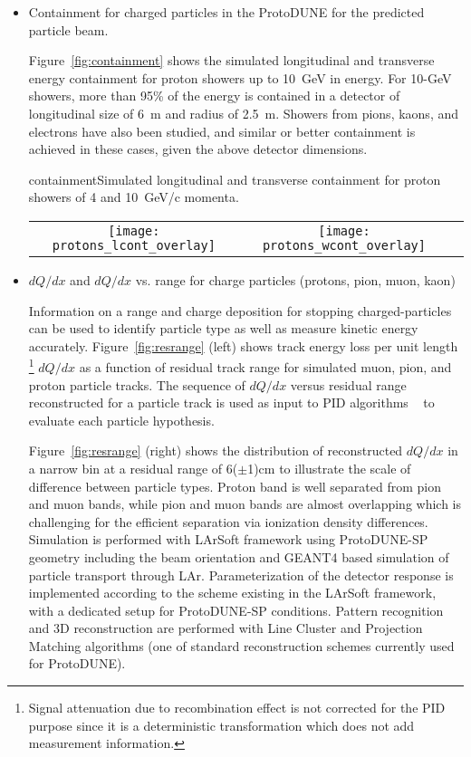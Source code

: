 \begin{itemize}
\item Containment for charged particles in the ProtoDUNE for the predicted particle beam. 

Figure~\ref{fig:containment} shows the simulated longitudinal and transverse 
energy containment for proton showers up to 10~GeV in energy.
For 10-GeV showers, more than 95\% of the energy is contained in a detector of longitudinal size of 6~m and radius of 2.5~m. Showers from pions, kaons, and electrons have also been studied, and similar or better containment is achieved in these cases, given the above detector dimensions.


\begin{cdrfigure}{containment}{Simulated longitudinal and transverse containment for proton showers of 4 and 10~GeV/c momenta.}
  \begin{tabular}{ccc}
   \texttt{[image: protons\_lcont\_overlay]}&
   \texttt{[image: protons\_wcont\_overlay]}\\
  \end{tabular}
\end{cdrfigure}

\item $dQ/dx$ and $dQ/dx$ vs. range for charge particles (protons, pion, muon, kaon)


Information on a range and charge deposition for stopping charged-particles can be used to identify particle type as well as measure kinetic energy accurately. Figure~\ref{fig:resrange}  (left) shows track energy loss per unit length \footnote{Signal attenuation due to recombination effect is not corrected for the PID purpose since it is a deterministic transformation which does not add measurement information.} $dQ/dx$ as a function of residual track range for simulated muon, pion, and proton particle tracks. The sequence of $dQ/dx$ versus residual range reconstructed for a particle track is used as input to PID algorithms ~\cite{nn_pid,rd_pid} to evaluate each particle hypothesis.

Figure~\ref{fig:resrange} (right) shows the distribution of reconstructed $dQ/dx$ in a narrow bin at a residual range of 6($\pm$1)cm to illustrate the scale of difference between particle types. Proton band is well separated from pion and muon bands, while pion and muon bands are almost overlapping which is challenging for the efficient separation via ionization density differences. 
Simulation is performed with LArSoft framework using ProtoDUNE-SP geometry including the beam orientation and GEANT4 based simulation of particle transport through LAr. Parameterization of the detector response is implemented according to the scheme existing in the LArSoft framework, with a dedicated setup for ProtoDUNE-SP conditions. Pattern recognition and 3D reconstruction are performed with Line Cluster and Projection Matching algorithms (one of standard reconstruction schemes currently used for ProtoDUNE).


\end{itemize}
